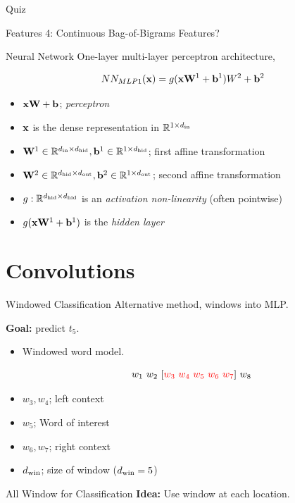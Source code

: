 \documentclass{beamer}
\begin{document}
\begin{frame}{Quiz}
\begin{itemize}
\begin{frame}{Features 4: Continuous Bag-of-Bigrams Features?}
\begin{center}
  \end{center}
\end{frame}

\begin{frame}{Neural Network}
  One-layer multi-layer perceptron architecture,

  \[NN_{MLP1}(\mathbf{x}) =  g(\mathbf{x}\mathbf{W}^1 + \mathbf{b}^1)W^2 + \mathbf{b}^2\]
  \begin{itemize}
  \item $\mathbf{x}\mathbf{W} + \mathbf{b}$; \textit{perceptron}
  \item $\mathbf{x}$ is the dense representation in $\mathbb{R}^{1 \times {d_{\mathrm{in}}}}$
  \item $\mathbf{W}^1 \in \mathbb{R}^{{d_{\mathrm{in}}} \times {d_{\mathrm{hid}}}}, \mathbf{b}^1 \in \mathbb{R}^{1 \times {d_{\mathrm{hid}}}}$; first affine transformation
  \item $\mathbf{W}^2 \in \mathbb{R}^{{d_{\mathrm{hid}}} \times {d_{\mathrm{out}}}}, \mathbf{b}^2 \in \mathbb{R}^{1 \times {d_{\mathrm{out}}}}$; second affine transformation
  \item $g:\mathbb{R}^{{d_{\mathrm{hid}}} \times {d_{\mathrm{hid}}}}$ is an \textit{activation non-linearity} (often pointwise)
  \item $g(\mathbf{x}\mathbf{W}^1 + \mathbf{b}^1)$ is the \textit{hidden layer}
  \end{itemize}
\end{frame}
\section{Convolutions} 

\begin{frame}{Windowed Classification}
  Alternative method, windows into MLP.

  \textbf{Goal:} predict $t_5$.


  \begin{itemize}
  \item Windowed word model.

  \[ w_1\ w_2\ [\textcolor{red}{w_3\ w_4\ w_5\ w_6\ w_7}]\ w_8 \]

  \item $w_3, w_4$; left context
  \item $w_5$; Word of interest
  \item $w_6, w_7$; right context

  \item ${d_{\mathrm{win}}}$; size of window (${d_{\mathrm{win}}} = 5$)
  \end{itemize}
\end{frame}



\begin{frame}{All Window for Classification}
  \textbf{Idea:} Use window at each location. 


\end{frame}
\end{itemize}
\end{frame}
\end{document}
